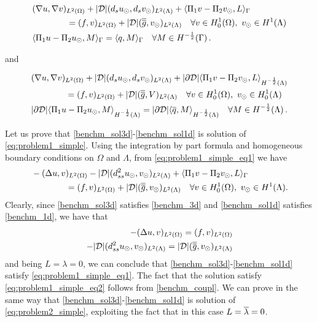 \documentclass[r]{siamart171218}
\begin{document}
\begin{subequations}\label{eq:problem1_simple}
\begin{align}
\label{eq:problem1_simple_eq1}
&(\nabla u,\nabla v)_{L^2(\Omega)} + |{\cal D}|(d_s \ud,d_s \vd)_{L^2(\Lambda)} 
+ \langle \Pi_1 v  - \Pi_2 \vd, L \rangle_\Gamma
\\
\nonumber
&\qquad\qquad= (f,v)_{L^2(\Omega)} + |{\cal D}| (\avrd{g},\vd)_{L^2(\Lambda)}
\quad \forall v \in H^1_0(\Omega), \ \vd \in H^1(\Lambda)
\\
\label{eq:problem1_simple_eq2}
&   \langle \Pi_1 u - \Pi_2 \ud , M \rangle_\Gamma =  \langle q , M \rangle_\Gamma
\quad \forall M \in H^{-\frac12}(\Gamma)\,.
\end{align}
\end{subequations}

and

\begin{subequations}\label{eq:problem2_simple}
\begin{align}
&(\nabla u,\nabla v)_{L^2(\Omega)} + |{\cal D}|(d_s \ud,d_s \vd)_{L^2(\Lambda)} 
+ |\partial {\cal D}| \langle \Pi_1 v - \Pi_2 \vd, L \rangle_{H^{-\frac12}(\Lambda)} 
\\
\nonumber
&\qquad\qquad= (f,v)_{L^2(\Omega)} + |{\cal D}| (\avrd{g},V)_{L^2(\Lambda)}
\quad \forall v \in H^1_0(\Omega), \ \vd \in H^1_0(\Lambda)
\\
&  |\partial {\cal D}| \langle \Pi_1 u -  \Pi_2 \ud, M \rangle_{H^{-\frac12}(\Lambda)} =|\partial {\cal D}| \langle \avrc{q}, M \rangle_{H^{-\frac12}(\Lambda)}
\quad \forall M \in H^{-\frac12}(\Lambda)\,.
\end{align}
\end{subequations}

Let us prove that \eqref{benchm_sol3d}-\eqref{benchm_sol1d} is solution of \eqref{eq:problem1_simple}. Using the integration by part formula and homogeneous boundary conditions on $\Omega$ and $\Lambda$, from \eqref{eq:problem1_simple_eq1} we have
\begin{align*}
&-(\Delta u, v)_{L^2(\Omega)} - |{\cal D}|(d^2_{ss} \ud, \vd)_{L^2(\Lambda)} 
+ \langle \Pi_1 v  - \Pi_2 \vd, L \rangle_\Gamma
\\
\nonumber
&\qquad\qquad= (f,v)_{L^2(\Omega)} + |{\cal D}| (\avrd{g},\vd)_{L^2(\Lambda)}
\quad \forall v \in H^1_0(\Omega), \ \vd \in H^1(\Lambda).
\\
\end{align*}
Clearly, since \eqref{benchm_sol3d} satisfies \eqref{benchm_3d} and \eqref{benchm_sol1d} satisfies \eqref{benchm_1d}, we have that \begin{align*}
-(\Delta u, v)_{L^2(\Omega)} =  (f,v)_{L^2(\Omega)} \\
-|{\cal D}|(d^2_{ss} \ud, \vd)_{L^2(\Lambda)}  = |{\cal D}| (\avrd{g},\vd)_{L^2(\Lambda)}
\end{align*}
and being $L=\lambda=0$, we can conclude that \eqref{benchm_sol3d}-\eqref{benchm_sol1d} satisfy \eqref{eq:problem1_simple_eq1}. The fact that the solution satisfy \eqref{eq:problem1_simple_eq2} follows from \eqref{benchm_coupl}. We can prove in the same way that \eqref{benchm_sol3d}-\eqref{benchm_sol1d} is solution of \eqref{eq:problem2_simple}, exploiting the fact that in this case $L=\overline{\lambda}=0$. 
\end{document}
